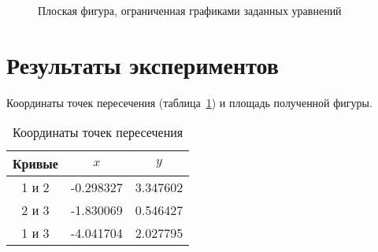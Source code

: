 \documentclass[a4paper,12pt,titlepage,finall]{article}
\begin{document}
\begin{figure}[h]
\centering
{}
\caption{Плоская фигура, ограниченная графиками заданных уравнений}
\label{plot1}
\end{figure}

\newpage

\section{Результаты экспериментов}

Координаты точек пересечения (таблица~\ref{table1}) и площадь полученной фигуры.

\begin{table}[h]
\centering
\begin{tabular}{|c|c|c|}
\hline
Кривые & $x$ & $y$ \\
\hline
1 и 2 & -0.298327 & 3.347602 \\
2 и 3 & -1.830069 & 0.546427 \\
1 и 3 & -4.041704 & 2.027795 \\
\hline
\end{tabular}
\caption{Координаты точек пересечения}
\label{table1}
\end{table}
\end{document}
